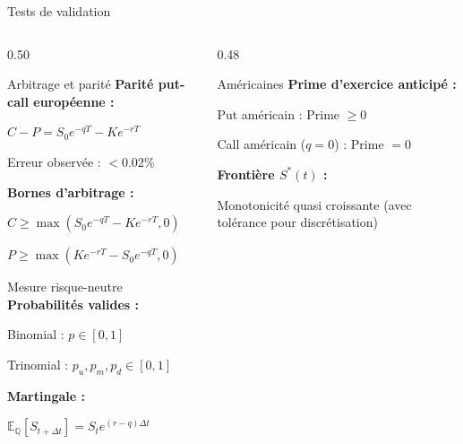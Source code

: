 \documentclass[aspectratio=169]{beamer}
\newcommand{\E}{\mathbb{E}}
\newcommand{\Q}{\mathbb{Q}}
\begin{document}
\begin{frame}{Tests de validation}
  \small
  
  \begin{columns}[T]
    \begin{column}{0.50\textwidth}
      \begin{keybox}{Arbitrage et parité}
        \scriptsize
        \textbf{Parité put-call européenne :}
        
        $C - P = S_0e^{-qT} - Ke^{-rT}$
        
        Erreur observée : $< 0.02\%$
        
        \vspace{2mm}
        \textbf{Bornes d'arbitrage :}
        
        $C \ge \max(S_0e^{-qT} - Ke^{-rT}, 0)$
        
        $P \ge \max(Ke^{-rT} - S_0e^{-qT}, 0)$
      \end{keybox}
      
      \vspace{2mm}
      \begin{keybox}{Mesure risque-neutre}
        \scriptsize
        \textbf{Probabilités valides :}
        
        Binomial : $p \in [0,1]$
        
        Trinomial : $p_u, p_m, p_d \in [0,1]$
        
        \vspace{1mm}
        \textbf{Martingale :}
        
        $\E_\Q[S_{t+\Delta t}] = S_t e^{(r-q)\Delta t}$
      \end{keybox}
    \end{column}
    
    \begin{column}{0.48\textwidth}
    \vspace{1.4cm}
      \begin{block}{Américaines}\scriptsize
        \textbf{Prime d'exercice anticipé :}
        
        Put américain : Prime $\ge 0$
        
        Call américain ($q=0$) : Prime $= 0$
        
        \vspace{2mm}
        \textbf{Frontière $S^*(t)$ :}
        
        Monotonicité quasi croissante (avec tolérance pour discrétisation)
      \end{block}
    \end{column}
  \end{columns}
\end{frame}
\end{document}
